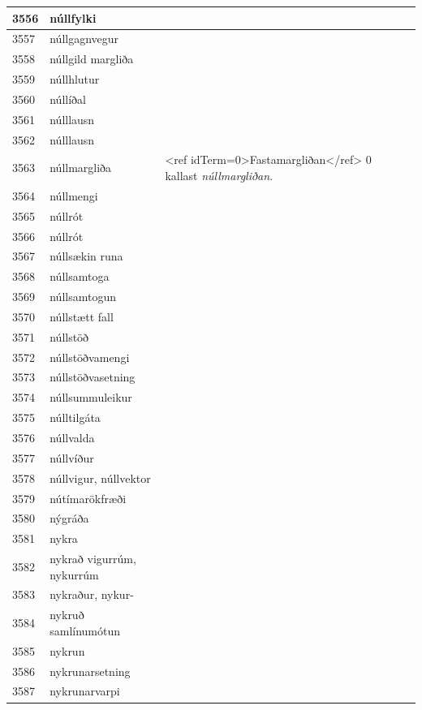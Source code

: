 \begin{longtable}{p{}|p{}|p{}|p{}|p{}}
\hline
3556 & núllfylki &  &  &  \\
\hline
3557 & núllgagnvegur &  &  &  \\
\hline
3558 & núllgild margliða &  &  &  \\
\hline
3559 & núllhlutur &  &  &  \\
\hline
3560 & núllíðal &  &  &  \\
\hline
3561 & núlllausn &  &  &  \\
\hline
3562 & núlllausn &  &  &  \\
\hline
3563 & núllmargliða & <ref idTerm=0>Fastamargliðan</ref> 0 kallast \textit{núllmargliðan}. &  &  \\
\hline
3564 & núllmengi &  &  &  \\
\hline
3565 & núllrót &  &  &  \\
\hline
3566 & núllrót &  &  &  \\
\hline
3567 & núllsækin runa &  &  &  \\
\hline
3568 & núllsamtoga &  &  &  \\
\hline
3569 & núllsamtogun &  &  &  \\
\hline
3570 & núllstætt fall &  &  &  \\
\hline
3571 & núllstöð &  &  &  \\
\hline
3572 & núllstöðvamengi &  &  &  \\
\hline
3573 & núllstöðvasetning &  &  &  \\
\hline
3574 & núllsummuleikur &  &  &  \\
\hline
3575 & núlltilgáta &  &  &  \\
\hline
3576 & núllvalda &  &  &  \\
\hline
3577 & núllvíður &  &  &  \\
\hline
3578 & núllvigur, núllvektor &  &  &  \\
\hline
3579 & nútímarökfræði &  &  &  \\
\hline
3580 & nýgráða &  &  &  \\
\hline
3581 & nykra &  &  &  \\
\hline
3582 & nykrað vigurrúm, nykurrúm &  &  &  \\
\hline
3583 & nykraður, nykur- &  &  &  \\
\hline
3584 & nykruð samlínumótun &  &  &  \\
\hline
3585 & nykrun &  &  &  \\
\hline
3586 & nykrunarsetning &  &  &  \\
\hline
3587 & nykrunarvarpi &  &  &  \\
\hline

\end{longtable}
